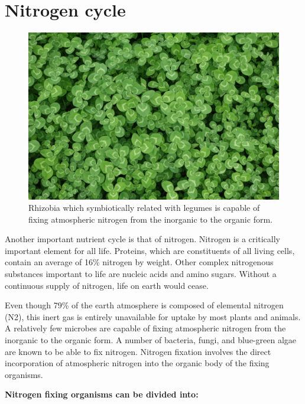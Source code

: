 \documentclass[]{book}
\begin{document}
\section{Nitrogen cycle}\label{nitrogen-cycle}

\begin{figure}

{\centering \includegraphics[width=1\linewidth]{figures/clover} 

}

\caption{Rhizobia which symbiotically related with legumes is capable of fixing atmospheric nitrogen from the inorganic to the organic form.}\label{fig:clover}
\end{figure}

Another important nutrient cycle is that of nitrogen. Nitrogen is a
critically important element for all life. Proteins, which are
constituents of all living cells, contain an average of 16\% nitrogen by
weight. Other complex nitrogenous substances important to life are
nucleic acids and amino sugars. Without a continuous supply of nitrogen,
life on earth would cease.

Even though 79\% of the earth atmosphere is composed of elemental
nitrogen (N2), this inert gas is entirely unavailable for uptake by most
plants and animals. A relatively few microbes are capable of fixing
atmospheric nitrogen from the inorganic to the organic form. A number of
bacteria, fungi, and blue-green algae are known to be able to fix
nitrogen. Nitrogen fixation involves the direct incorporation of
atmospheric nitrogen into the organic body of the fixing organisms.

\textbf{Nitrogen fixing organisms can be divided into:}
\end{document}

